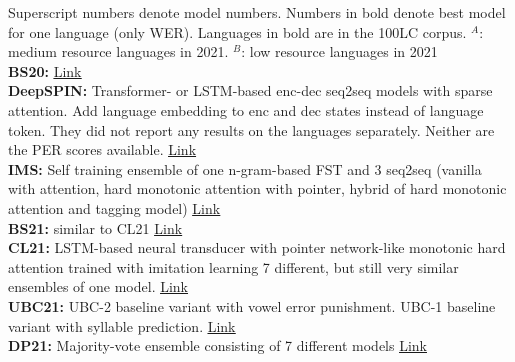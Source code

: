 {\small
\noindent
Superscript numbers denote model numbers. Numbers in bold denote best model for one language (only WER). Languages in bold are in the 100LC corpus. $^A$: medium resource languages in 2021. $^B$: low resource languages in 2021\\ 

\noindent
\textbf{BS20:} \href{https://aclanthology.org/2020.sigmorphon-1.2/}{\underline{Link}}\\
\textbf{DeepSPIN:} Transformer- or LSTM-based enc-dec seq2seq models with sparse attention. Add language embedding to enc and dec states instead of language token. They did not report any results on the languages separately. Neither are the PER scores available. \href{https://aclanthology.org/2020.sigmorphon-1.4/}{\underline{Link}}\\
\textbf{IMS:} Self training ensemble of one n-gram-based FST and 3 seq2seq (vanilla with attention, hard monotonic attention with pointer, hybrid of hard monotonic attention and tagging model) \href{https://aclanthology.org/2020.sigmorphon-1.5/}{\underline{Link}} \\
\textbf{BS21:} similar to CL21 \href{https://aclanthology.org/2021.sigmorphon-1.13/}{\underline{Link}}\\
\textbf{CL21:} LSTM-based neural transducer with pointer network-like monotonic hard attention trained with imitation learning 7 different, but still very similar ensembles of one model. \href{https://aclanthology.org/2021.sigmorphon-1.17/}{\underline{Link}}\\
\textbf{UBC21:} UBC-2 baseline variant with vowel error punishment. UBC-1 baseline variant with syllable prediction. \href{https://aclanthology.org/2021.sigmorphon-1.15/}{\underline{Link}}\\
\textbf{DP21:} Majority-vote ensemble consisting of 7 different models \href{https://aclanthology.org/2021.sigmorphon-1.16/}{\underline{Link}}
\noindent


}







